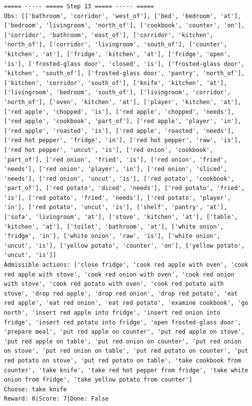\documentclass[11pt]{article}
\begin{document}
\begin{lstlisting}
===== ----- ===== Step 13 ===== ----- =====
Obs: [['bathroom', 'corridor', 'west_of'], ['bed', 'bedroom', 'at'], ['bedroom', 'livingroom', 'north_of'], ['cookbook', 'counter', 'on'], ['corridor', 'bathroom', 'east_of'], ['corridor', 'kitchen', 'north_of'], ['corridor', 'livingroom', 'south_of'], ['counter', 'kitchen', 'at'], ['fridge', 'kitchen', 'at'], ['fridge', 'open', 'is'], ['frosted-glass door', 'closed', 'is'], ['frosted-glass door', 'kitchen', 'south_of'], ['frosted-glass door', 'pantry', 'north_of'], ['kitchen', 'corridor', 'south_of'], ['knife', 'kitchen', 'at'], ['livingroom', 'bedroom', 'south_of'], ['livingroom', 'corridor', 'north_of'], ['oven', 'kitchen', 'at'], ['player', 'kitchen', 'at'], ['red apple', 'chopped', 'is'], ['red apple', 'chopped', 'needs'], ['red apple', 'cookbook', 'part_of'], ['red apple', 'player', 'in'], ['red apple', 'roasted', 'is'], ['red apple', 'roasted', 'needs'], ['red hot pepper', 'fridge', 'in'], ['red hot pepper', 'raw', 'is'], ['red hot pepper', 'uncut', 'is'], ['red onion', 'cookbook', 'part_of'], ['red onion', 'fried', 'is'], ['red onion', 'fried', 'needs'], ['red onion', 'player', 'in'], ['red onion', 'sliced', 'needs'], ['red onion', 'uncut', 'is'], ['red potato', 'cookbook', 'part_of'], ['red potato', 'diced', 'needs'], ['red potato', 'fried', 'is'], ['red potato', 'fried', 'needs'], ['red potato', 'player', 'in'], ['red potato', 'uncut', 'is'], ['shelf', 'pantry', 'at'], ['sofa', 'livingroom', 'at'], ['stove', 'kitchen', 'at'], ['table', 'kitchen', 'at'], ['toilet', 'bathroom', 'at'], ['white onion', 'fridge', 'in'], ['white onion', 'raw', 'is'], ['white onion', 'uncut', 'is'], ['yellow potato', 'counter', 'on'], ['yellow potato', 'uncut', 'is']]
Admissible actions: ['close fridge', 'cook red apple with oven', 'cook red apple with stove', 'cook red onion with oven', 'cook red onion with stove', 'cook red potato with oven', 'cook red potato with stove', 'drop red apple', 'drop red onion', 'drop red potato', 'eat red apple', 'eat red onion', 'eat red potato', 'examine cookbook', 'go north', 'insert red apple into fridge', 'insert red onion into fridge', 'insert red potato into fridge', 'open frosted-glass door', 'prepare meal', 'put red apple on counter', 'put red apple on stove', 'put red apple on table', 'put red onion on counter', 'put red onion on stove', 'put red onion on table', 'put red potato on counter', 'put red potato on stove', 'put red potato on table', 'take cookbook from counter', 'take knife', 'take red hot pepper from fridge', 'take white onion from fridge', 'take yellow potato from counter']
Choose: take knife
Reward: 0|Score: 7|Done: False


\end{lstlisting}
\end{document}

